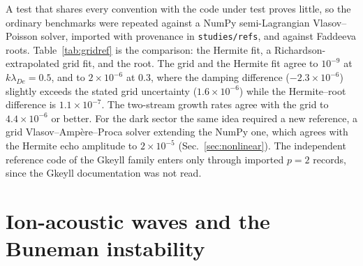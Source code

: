 A test that shares every convention with the code under test proves little, so the ordinary benchmarks were repeated against a NumPy semi-Lagrangian Vlasov--Poisson solver, imported with provenance in \texttt{studies/refs}, and against Faddeeva roots. Table~\ref{tab:gridref} is the comparison: the Hermite fit, a Richardson-extrapolated grid fit, and the root. The grid and the Hermite fit agree to $10^{-9}$ at $k\lambda_{De}=0.5$, and to $2\times10^{-6}$ at $0.3$, where the damping difference ($-2.3\times10^{-6}$) slightly exceeds the stated grid uncertainty ($1.6\times10^{-6}$) while the Hermite--root difference is $1.1\times10^{-7}$. The two-stream growth rates agree with the grid to $4.4\times10^{-6}$ or better. For the dark sector the same idea required a new reference, a grid Vlasov--Ampère--Proca solver extending the NumPy one, which agrees with the Hermite echo amplitude to $2\times10^{-5}$ (Sec.~\ref{sec:nonlinear}). The independent reference code of the Gkeyll family enters only through imported $p=2$ records, since the Gkeyll documentation was not read.

\begin{table}[t]
\caption{Hermite against the independent semi-Lagrangian grid and the Faddeeva root (ordinary plasma). Differences are Hermite minus grid.}\label{tab:gridref}
\small
{}
\end{table}

\section{Ion-acoustic waves and the Buneman instability}\label{sec:ia-buneman}

